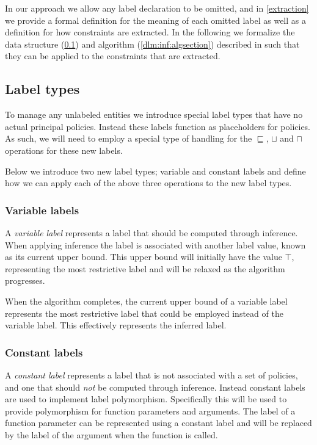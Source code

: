 In our approach we allow any label declaration to be omitted, and in \cref{extraction} we provide a formal definition for the meaning of each omitted label as well as a definition for how constraints are extracted.
In the following we formalize the data structure (\cref{dlm:inf:types}) and algorithm (\cref{dlm:inf:algsection}) described in \cite{myers1997} such that they can be applied to the constraints that are extracted.

\subsection{Label types}\label{dlm:inf:types}
To manage any unlabeled entities we introduce special label types that have no actual principal policies.
Instead these labels function as placeholders for policies.
As such, we will need to employ a special type of handling for the $\sqsubseteq$, $\sqcup$ and $\sqcap$ operations for these new labels.

Below we introduce two new label types; variable and constant labels and define how we can apply each of the above three operations to the new label types.

\subsubsection{Variable labels}
A \emph{variable label} represents a label that should be computed through inference.
When applying inference the label is associated with another label value, known as its current upper bound.
This upper bound will initially have the value $\top$, representing the most restrictive label and will be relaxed as the algorithm progresses.

When the algorithm completes, the current upper bound of a variable label represents the most restrictive label that could be employed instead of the variable label.
This effectively represents the inferred label.

\subsubsection{Constant labels}
A \textit{constant label} represents a label that is not associated with a set of policies, and one that should \textit{not} be computed through inference.
Instead constant labels are used to implement label polymorphism.
Specifically this will be used to provide polymorphism for function parameters and arguments.
The label of a function parameter can be represented using a constant label and will be replaced by the label of the argument when the function is called.

